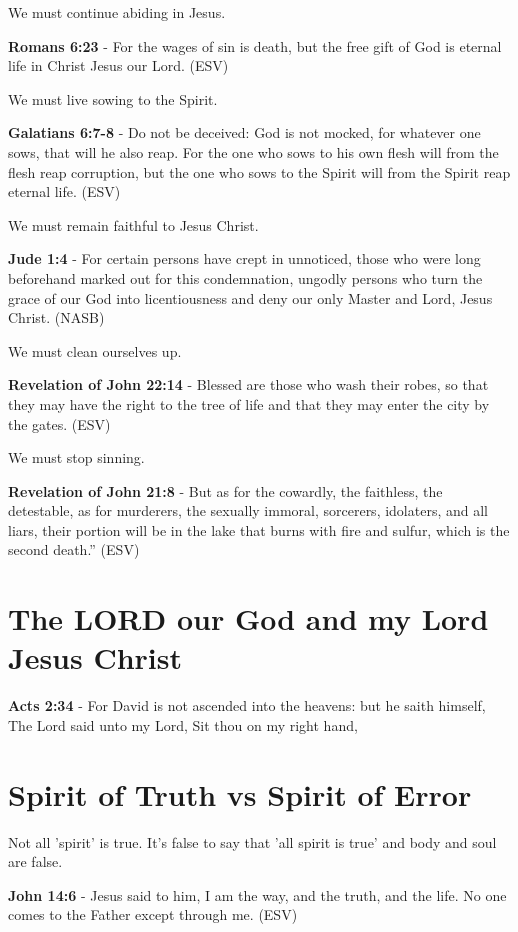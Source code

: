 \documentclass[11pt]{article}
\begin{document}
We must continue abiding in Jesus.

\textbf{Romans 6:23} -  For the wages of sin is death, but the free gift of God is eternal life in Christ Jesus our Lord.  (ESV)

We must live sowing to the Spirit.

\textbf{Galatians 6:7-8} - Do not be deceived: God is not mocked, for whatever one sows, that will he also reap. For the one who sows to his own flesh will from the flesh reap corruption, but the one who sows to the Spirit will from the Spirit reap eternal life.  (ESV)

We must remain faithful to Jesus Christ.

\textbf{Jude 1:4} - For certain persons have crept in unnoticed, those who were long beforehand marked out for this condemnation, ungodly persons who turn the grace of our God into licentiousness and deny our only Master and Lord, Jesus Christ.  (NASB)

We must clean ourselves up.

\textbf{Revelation of John 22:14} - Blessed are those who wash their robes, so that they may have the right to the tree of life and that they may enter the city by the gates. (ESV)

We must stop sinning.

\textbf{Revelation of John 21:8} - But as for the cowardly, the faithless, the detestable, as for murderers, the sexually immoral, sorcerers, idolaters, and all liars, their portion will be in the lake that burns with fire and sulfur, which is the second death.”  (ESV)

\section{The LORD our God and my Lord Jesus Christ}
\label{sec:org59e68a0}
\textbf{Acts 2:34} - For David is not ascended into the heavens: but he saith himself, The Lord said unto my Lord, Sit thou on my right hand,

\section{Spirit of Truth vs Spirit of Error}
\label{sec:org2cb433c}
Not all 'spirit' is true.
It's false to say that 'all spirit is true' and body and soul are false.

\textbf{John 14:6} - Jesus said to him, I am the way, and the truth, and the life.  No one comes to the Father except through me.  (ESV)
\end{document}
